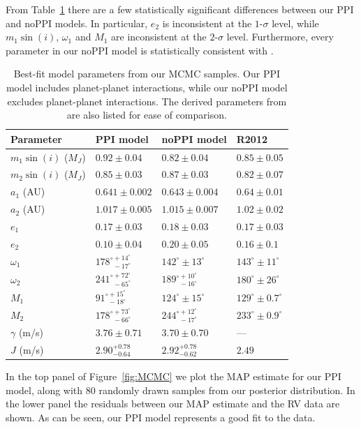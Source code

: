 From Table~\ref{tab:MCMC} there are a few statistically significant differences between our PPI and noPPI models. 
In particular, $e_2$ is inconsistent at the $1$-$\sigma$ level, while $m_1\sin(i)$, $\omega_1$ and $M_1$ are inconsistent at the $2$-$\sigma$ level.
Furthermore, every parameter in our noPPI model is statistically consistent with \R.

\begin{table}
\begin{tabular}{llll}
\hline \hline
Parameter & PPI model & noPPI model & R2012\\ 
 \hline \hline
 $m_1\sin(i)$ ($M_J$) & $0.92 \pm 0.04$ & $0.82 \pm 0.04$ & $0.85 \pm 0.05$ \\ 
 $m_2\sin(i)$ ($M_J$) & $0.85 \pm 0.03$ & $0.87 \pm 0.03$ & $0.82 \pm 0.07$ \\ 
 $a_1$ (AU) & $0.641 \pm 0.002$ & $0.643 \pm 0.004$ & $0.64 \pm 0.01$ \\
 $a_2$ (AU) & $1.017 \pm 0.005$ & $1.015 \pm 0.007$ & $1.02 \pm 0.02$\\
 $e_1$ & $0.17 \pm 0.03$ & $0.18 \pm 0.03$ & $0.17 \pm 0.03$\\
 $e_2$ & $0.10 \pm 0.04$ & $0.20 \pm 0.05$ & $0.16 \pm 0.1$\\
 $\omega_1$ & $178^{\circ +14^{\circ}}_{\ \ -17^{\circ}}$ & $142^{\circ} \pm 13^{\circ}$ & $143^{\circ} \pm 11^{\circ}$\\
 $\omega_2$ & $241^{\circ +72^{\circ}}_{\ \ -65^{\circ}}$ & $189^{\circ +10^{\circ}}_{\ \ -16^{\circ}}$ & $180^{\circ} \pm 26^{\circ}$\\
 $M_1$ & $91^{\circ +15^{\circ}}_{\ \ -18^{\circ}}$ & $124^{\circ} \pm 15^{\circ}$ & $129^{\circ} \pm 0.7^{\circ}$\\
 $M_2$ & $178^{\circ +73^{\circ}}_{\ \ -66^{\circ}}$ & $244^{\circ +12^{\circ}}_{\ \ -17^{\circ}}$ & $233^{\circ} \pm 0.9^{\circ}$\\
 $\gamma$ (m/s) & $3.76 \pm 0.71$ & $3.70 \pm 0.70$ & --- \\
 $J$ (m/s) & $2.90^{+0.78}_{-0.64}$ & $2.92^{+0.78}_{-0.62}$ & $2.49$\\
 \hline
\end{tabular}
\caption{Best-fit model parameters from our MCMC samples. Our PPI model includes planet-planet interactions, while our noPPI model excludes planet-planet interactions. The derived parameters from \R are also listed for ease of comparison.}
\label{tab:MCMC}
\end{table}

In the top panel of Figure~\ref{fig:MCMC} we plot the MAP estimate for our PPI model, along with 80 randomly drawn samples from our posterior distribution.
In the lower panel the residuals between our MAP estimate and the RV data are shown. 
As can be seen, our PPI model represents a good fit to the data. 

